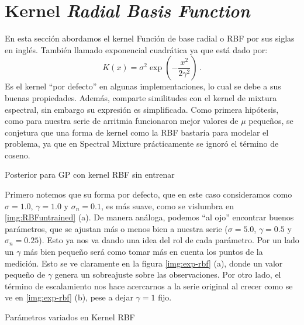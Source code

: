 \documentclass[letterpaper,11pt,oneside]{article}
\theoremstyle{break}
\begin{document}

\section{Kernel \textit{Radial Basis Function}}

En esta sección abordamos el kernel Función de base radial o RBF por sus siglas en inglés. También llamado exponencial cuadrática ya que está dado por:
$$ K(x) = \sigma^2\exp(-\frac{x^2}{2\gamma^2}) \,.$$
Es el kernel ``por defecto'' en algunas implementaciones, lo cual se debe a sus buenas propiedades. Además, comparte similitudes con el kernel de mixtura espectral, sin embargo su expresión es simplificada. Como primera hipótesis, como para nuestra serie de arritmia funcionaron mejor valores de $\mu$ pequeños, se conjetura que una forma de kernel como la RBF bastaría para modelar el problema, ya que en Spectral Mixture prácticamente se ignoró el término de coseno.

\begin{images}[\label{img:RBFuntrained}]{Posterior para GP con kernel RBF sin entrenar}
\end{images}

Primero notemos que su forma por defecto, que en este caso consideramos como $\sigma=1.0$, $\gamma=1.0$ y $\sigma_n=0.1$, es más suave, como se vislumbra en \ref{img:RBFuntrained} (a). De manera análoga, podemos ``al ojo'' encontrar buenos parámetros, que se ajustan más o menos bien a nuestra serie ($\sigma=5.0$, $\gamma=0.5$ y $\sigma_n=0.25$). Esto ya nos va dando una idea del rol de cada parámetro. Por un lado un $\gamma$ más bien pequeño será como tomar más en cuenta los puntos de la medición. Esto se ve claramente en la figura \ref{img:exp-rbf} (a), donde un valor pequeño de $\gamma$ genera un sobreajuste sobre las observaciones. Por otro lado, el término de escalamiento nos hace acercarnos a la serie original al crecer como se ve en \ref{img:exp-rbf} (b), pese a dejar $\gamma=1$ fijo.

\begin{images}[\label{img:exp-rbf}]{Parámetros variados en Kernel RBF}
\end{images}
\end{document}
